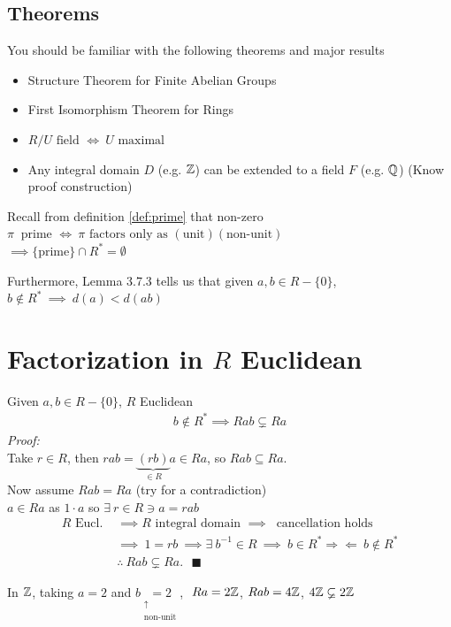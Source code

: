 \subsection*{Theorems}
You should be familiar with the following theorems and major results
\begin{itemize}
    \item Structure Theorem for Finite Abelian Groups
    \item First Isomorphism Theorem for Rings
    \item $R/U \text{ field } \iff \ U \text{ maximal}$
    \item Any integral domain $D$ (e.g. ${\mathbb{Z}}$) can be extended to a field $F$ (e.g. ${\mathbb{Q}}$) (Know proof
    construction)
\end{itemize}
\newpage

Recall from definition \ref{def:prime} that non-zero
$\pi \ \text{ prime }\iff \ \pi \text{ factors only as }(\text{unit})(\text{non-unit})$\\
$\implies \{\text{prime}\}\cap R^*=\emptyset$\\ \steezybreak

\noindent Furthermore, Lemma 3.7.3 tells us that given $a,b\in R-\{0\}$,
$b\not\in R^* \ \implies \ d(a)<d(ab)$
\section*{Factorization in $R$ Euclidean}
\begin{lemma*}
    Given $a,b\in R-\{0\}$, $R$ Euclidean
    \begin{align*}
        b\not\in R^* \implies Rab \varsubsetneq Ra
    \end{align*}
    \textit{Proof:} \\ \steezybreak
    Take $r\in R$, then $rab = \underbrace{(rb)}_{\in R}a \in Ra$, so $Rab\subseteq Ra$. \\

    \noindent Now assume $Rab=Ra$ (try for a contradiction) \\
    $a\in Ra$ as $1\cdot a$ so $\exists \ r \in R \ni a=rab$
    \begin{align*}
        R \text{ Eucl. } &\implies R \text{ integral domain } \implies \ \text{ cancellation holds } \\
        &\implies \ 1=rb \ \implies \exists \ b^{-1}\in R \ \implies \ b\in R^* \Rightarrow \Leftarrow \ b\not \in R^* \\
        &\therefore \ Rab \varsubsetneq Ra. \ \ \ \blacksquare
    \end{align*}
\end{lemma*}
\begin{example}
    In ${\mathbb{Z}}$, taking $a=2$ and $b\underset{\substack{\uparrow \\ \text{non-unit}}}{=2}$, $\ Ra=2{\mathbb{Z}}$,
    $Rab=4{\mathbb{Z}}$, $4{\mathbb{Z}} \varsubsetneq 2{\mathbb{Z}}$
\end{example}


